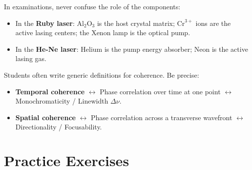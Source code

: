 \begin{examtip}
In examinations, never confuse the role of the components:
\begin{itemize}
    \item In the \textbf{Ruby laser}: $\text{Al}_2\text{O}_3$ is the host crystal matrix; $\text{Cr}^{3+}$ ions are the active lasing centers; the Xenon lamp is the optical pump.
    \item In the \textbf{He-Ne laser}: Helium is the pump energy absorber; Neon is the active lasing gas.
\end{itemize}
\end{examtip}

\begin{commonmistake}
Students often write generic definitions for coherence. Be precise:
\begin{itemize}
    \item \textbf{Temporal coherence} $\longleftrightarrow$ Phase correlation over time at one point $\longleftrightarrow$ Monochromaticity / Linewidth $\Delta \nu$.
    \item \textbf{Spatial coherence} $\longleftrightarrow$ Phase correlation across a transverse wavefront $\longleftrightarrow$ Directionality / Focusability.
\end{itemize}
\end{commonmistake}

\section{Practice Exercises}

